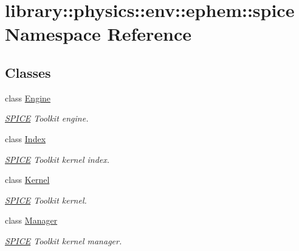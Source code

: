 \hypertarget{namespacelibrary_1_1physics_1_1env_1_1ephem_1_1spice}{}\section{library\+:\+:physics\+:\+:env\+:\+:ephem\+:\+:spice Namespace Reference}
\label{namespacelibrary_1_1physics_1_1env_1_1ephem_1_1spice}
\subsection*{Classes}
\begin{DoxyCompactItemize}
\item 
class \hyperlink{classlibrary_1_1physics_1_1env_1_1ephem_1_1spice_1_1_engine}{Engine}
\begin{DoxyCompactList}\small\item\em \hyperlink{classlibrary_1_1physics_1_1env_1_1ephem_1_1_s_p_i_c_e}{S\+P\+I\+CE} Toolkit engine. \end{DoxyCompactList}\item 
class \hyperlink{classlibrary_1_1physics_1_1env_1_1ephem_1_1spice_1_1_index}{Index}
\begin{DoxyCompactList}\small\item\em \hyperlink{classlibrary_1_1physics_1_1env_1_1ephem_1_1_s_p_i_c_e}{S\+P\+I\+CE} Toolkit kernel index. \end{DoxyCompactList}\item 
class \hyperlink{classlibrary_1_1physics_1_1env_1_1ephem_1_1spice_1_1_kernel}{Kernel}
\begin{DoxyCompactList}\small\item\em \hyperlink{classlibrary_1_1physics_1_1env_1_1ephem_1_1_s_p_i_c_e}{S\+P\+I\+CE} Toolkit kernel. \end{DoxyCompactList}\item 
class \hyperlink{classlibrary_1_1physics_1_1env_1_1ephem_1_1spice_1_1_manager}{Manager}
\begin{DoxyCompactList}\small\item\em \hyperlink{classlibrary_1_1physics_1_1env_1_1ephem_1_1_s_p_i_c_e}{S\+P\+I\+CE} Toolkit kernel manager. \end{DoxyCompactList}\end{DoxyCompactItemize}

